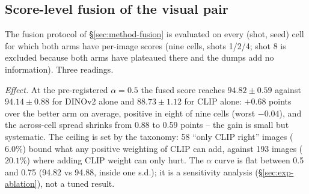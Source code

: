 \subsection{Score-level fusion of the visual pair}
\label{sec:exp-fusion}

\begin{table}[t]
\centering
\caption{Score fusion of the two visual arms, mean $\pm$ s.d.\ over nine cells (shots
1/2/4 $\times$ seeds 0/1/2; 960 test images each). Fused $=\alpha z_{\mathrm{DINOv2}} +
(1-\alpha) z_{\mathrm{CLIP}}$ after per-category median/MAD standardisation on the 20
calibration scores; $\alpha{=}1$/$\alpha{=}0$ reproduce the single branches exactly (max
deviation $1.1\times10^{-16}$). Realised FPR is the mean over cells at the nominal 5\%
threshold.}
\label{tab:fusion}
\small
{}
\end{table}

The fusion protocol of \S\ref{sec:method-fusion} is evaluated on every (shot, seed) cell
for which both arms have per-image scores (nine cells, shots 1/2/4; shot 8 is excluded
because both arms have plateaued there and the dumps add no information). Three readings.

\emph{Effect.} At the pre-registered $\alpha = 0.5$ the fused score reaches
$94.82 \pm 0.59$ against $94.14 \pm 0.88$ for DINOv2 alone and $88.73 \pm 1.12$ for CLIP
alone: $+0.68$ points over the better arm on average, positive in eight of nine cells
(worst $-0.04$), and the across-cell spread shrinks from 0.88 to 0.59 points -- the gain is
small but systematic. The ceiling is set by the taxonomy: 58 ``only CLIP right'' images
($6.0\%$) bound what any positive weighting of CLIP can add, against 193 images ($20.1\%$)
where adding CLIP weight can only hurt. The $\alpha$ curve is flat between 0.5 and 0.75
(94.82 vs 94.88, inside one s.d.); it is a sensitivity analysis (\S\ref{sec:exp-ablation}),
not a tuned result.

